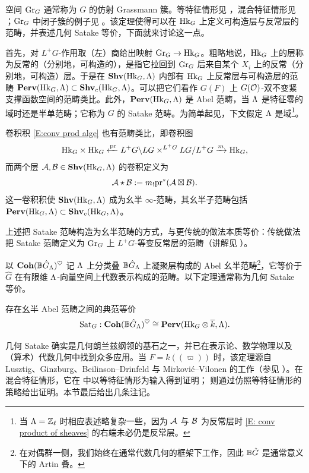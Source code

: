 空间 ${\operatorname{Gr}}_G$ 通常称为 $G$ 的仿射 Grassmann 簇。等特征情形见 \cite{Beauville-Laszlo, Faltings-Loop}，混合特征情形见 \cite{Zhu-Satake-Mixed, Bhatt-Scholze-Witt}；${\operatorname{Gr}}_G$ 中闭子簇的例子见 \cite{Zhu-PCMI, Zhu-CDM}。该定理使得可以在 ${\operatorname{Hk}}_G$ 上定义可构造层与反常层的范畴，并表述几何 Satake 等价，下面就来讨论这一点。

首先，对 $L^+G$-作用取（左）商给出映射 ${\operatorname{Gr}}_G\to{\operatorname{Hk}}_G$。粗略地说，${\operatorname{Hk}}_G$ 上的层称为反常的（分别地，可构造的），是指它拉回到 ${\operatorname{Gr}}_G$ 后来自某个 $X_i$ 上的反常（分别地，可构造）层。于是在 ${\mathbf{Shv}}({\operatorname{Hk}}_G,{\Lambda})$ 内部有 ${\operatorname{Hk}}_G$ 上反常层与可构造层的范畴 ${\mathbf{Perv}}({\operatorname{Hk}}_G,{\Lambda})\subset{\mathbf{Shv}}_{c}({\operatorname{Hk}}_G,{\Lambda})$。可以把它们看作 $G(F)$ 上 $G({\mathcal O})$-双不变紧支撑函数空间的范畴类比。此外，${\mathbf{Perv}}({\operatorname{Hk}}_G,{\Lambda})$ 是 Abel 范畴，当 ${\Lambda}$ 是特征零的域时还是半单范畴；它称为 $G$ 的 Satake 范畴。为简单起见，下文假定 ${\Lambda}$ 是域\footnote{当 ${\Lambda}={\mathbb Z}_\ell$ 时相应表述略复杂一些，因为 ${\mathcal A}$ 与 ${\mathcal B}$ 为反常层时 \eqref{E: conv product of sheaves} 的右端未必仍是反常层。}。

卷积积 \eqref{E:conv prod alge} 也有范畴类比，即卷积图
\[
 {\operatorname{Hk}}_G\times{\operatorname{Hk}}_G\xleftarrow{{\operatorname{pr}}}  L^+G\backslash LG\times^{L^+G} LG/L^+G\xrightarrow{m} {\operatorname{Hk}}_G,
\]
而两个层 ${\mathcal A},{\mathcal B}\in{\mathbf{Shv}}({\operatorname{Hk}}_G,{\Lambda})$ 的卷积定义为
\begin{equation}\label{E: conv product of sheaves}
{\mathcal A}\star{\mathcal B}:= m_!{\operatorname{pr}}^*({\mathcal A}\boxtimes {\mathcal B}).
\end{equation}
这一卷积积使 ${\mathbf{Shv}}({\operatorname{Hk}}_G,{\Lambda})$ 成为幺半 $\infty$-范畴，其幺半子范畴包括 ${\mathbf{Perv}}({\operatorname{Hk}}_G,{\Lambda})\subset {\mathbf{Shv}}_{c}({\operatorname{Hk}}_G,{\Lambda})$。

\begin{rmk}
上述把 Satake 范畴构造为幺半范畴的方式，与更传统的做法本质等价：传统做法把 Satake 范畴定义为 ${\operatorname{Gr}}_G$ 上 $L^+G$-等变反常层的范畴（讲解见 \cite{Zhu-PCMI}）。
\end{rmk}

以 ${\mathbf{Coh}}({\mathbb B}\hat{G}_{\Lambda})^{\heartsuit}$ 记 ${\Lambda}$ 上分类叠 ${\mathbb B}\hat{G}_{\Lambda}$ 上凝聚层构成的 Abel 幺半范畴\footnote{在对偶群一侧，我们始终在通常代数几何的框架下工作，因此 ${\mathbb B}\hat{G}$ 是通常意义下的 Artin 叠。}，它等价于 $\hat{G}$ 在有限维 ${\Lambda}$-向量空间上代数表示构成的范畴。以下定理通常称为几何 Satake 等价。

\begin{thm}\label{intro:geomSat}
存在幺半 Abel 范畴之间的典范等价
\[
{\operatorname{Sat}}_G:  {\mathbf{Coh}}({\mathbb B}\hat{G}_{\Lambda})^{\heartsuit}\cong {\mathbf{Perv}}({\operatorname{Hk}}_G\otimes \overline k,{\Lambda}).
\]
\end{thm}

几何 Satake 确实是几何朗兰兹纲领的基石之一，并已在表示论、数学物理以及（算术）代数几何中找到众多应用。当 $F=k(\!(\varpi)\!)$ 时，该定理源自 Lusztig、Ginzburg、Beilinson--Drinfeld 与 Mirković--Vilonen 的工作（参见 \cite{Lusztig-q-analog, Beilinson-Drinfeld-Hitchin, Mirkovic-Vilonen-GeoSat}）。在混合特征情形，它在 \cite{Zhu-Satake-Mixed, Yu-Integral-Satake} 中以等特征情形为输入得到证明；\cite{Fargues-Scholze-Geometrization} 则通过仿照等特征情形的策略给出证明。本节最后给出几条注记。

